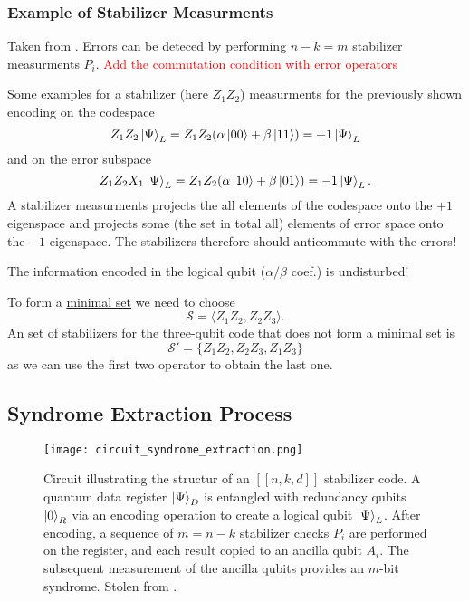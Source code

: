 \subsubsection{Example of Stabilizer Measurments}
Taken from \cite{QECintro}.
Errors can be deteced by performing $n-k=m$ stabilizer measurments $P_i$.
\textcolor{red}{Add the commutation condition with error operators}

Some examples for a stabilizer (here $Z_1 Z_2$) measurments for the previously shown encoding on the codespace
\begin{equation}
    Z_1 Z_2 \ket{\Psi}_L = Z_1 Z_2 (\alpha \ket{00}+ \beta \ket{11}) = +1 \ket{\Psi}_L
\end{equation}
and on the error subspace
\begin{equation}
    Z_1 Z_2 X_1\ket{\Psi}_L = Z_1 Z_2 (\alpha \ket{10}+ \beta \ket{01}) = -1 \ket{\Psi}_L.
\end{equation}
A stabilizer measurments projects the all elements of the codespace onto the $+1$ eigenspace 
and projects some (the set in total all) elements of error space onto the $-1$ eigenspace. 
The stabilizers therefore should anticommute with the errors! 

The information encoded in the logical qubit ($\alpha/\beta$ coef.) is undisturbed!

To form a \hyperref[sec:basic.math.minimal_set]{minimal set} we need to choose
\begin{equation}
    \mathcal{S} = \langle Z_1 Z_2, Z_2 Z_3 \rangle.
\end{equation}
An set of stabilizers for the three-qubit code that does not form a minimal set is
\begin{equation}
    \mathcal{S}' = \{ Z_1 Z_2, Z_2 Z_3, Z_1 Z_3\}
\end{equation}
as we can use the first two operator to obtain the last one. 


\subsection{Syndrome Extraction Process}\label{sec:basic.qc.syndrome_extraction_process}

\begin{figure}[h]
    \begin{center}
        \texttt{[image: circuit\_syndrome\_extraction.png]}
    \end{center}
    \caption{
        Circuit illustrating the structur of an $[[n,k,d]]$ stabilizer code. 
        A quantum data register $\ket{\Psi}_D$ is entangled with redundancy qubits $\ket{0}_R$ via an encoding operation to create a logical qubit $\ket{\Psi}_L$.
        After encoding, a sequence of $m = n - k$ stabilizer checks $P_i$ are performed on the register, and each result copied to an ancilla qubit $A_i$.         
        The subsequent measurement of the ancilla qubits provides an $m$-bit syndrome.
        Stolen from \cite{QECintro}.
    }
    \label{fig:basic.qc.syndrome_extraction.circuit}
\end{figure}


